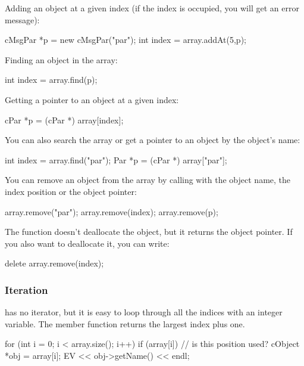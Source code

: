 Adding an object at a given index (if the index is occupied,
you will get an error message):

\begin{cpp}
cMsgPar *p = new cMsgPar("par");
int index = array.addAt(5,p);
\end{cpp}

Finding an object in the array:

\begin{cpp}
int index = array.find(p);
\end{cpp}

Getting a pointer to an object at a given index:

\begin{cpp}
cPar *p = (cPar *) array[index];
\end{cpp}

You can also search the array or get a pointer to an object by
the object's name:

\begin{cpp}
int index = array.find("par");
Par *p = (cPar *) array["par"];
\end{cpp}

You can remove an object from the array by calling 
with the object name, the index position or the object pointer:

\begin{cpp}
array.remove("par");
array.remove(index);
array.remove(p);
\end{cpp}


The  function doesn't deallocate the object, but it
returns the object pointer. If you also want to deallocate it, you can
write:

\begin{cpp}
delete array.remove(index);
\end{cpp}

\subsubsection{Iteration}
\label{sec:sim-lib:carray-iteration}

 has no iterator, but it is easy to loop through all the
indices with an integer variable. The  member function
returns the largest index plus one.

\begin{cpp}
for (int i = 0; i < array.size(); i++) {
  if (array[i]) { // is this position used?
    cObject *obj = array[i];
    EV << obj->getName() << endl;
  }
}
\end{cpp}


